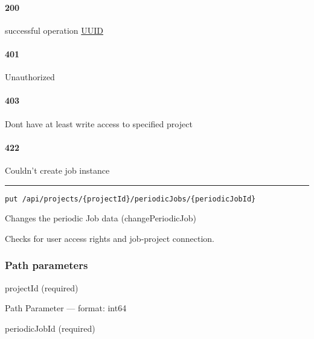 \hypertarget{section-40}{%
\paragraph{200}\label{section-40}}

successful operation \protect\hyperlink{UUID}{UUID}

\hypertarget{section-41}{%
\paragraph{401}\label{section-41}}

Unauthorized \protect\hyperlink{}{}

\hypertarget{section-42}{%
\paragraph{403}\label{section-42}}

Dont have at least write access to specified project
\protect\hyperlink{}{}

\hypertarget{section-43}{%
\paragraph{422}\label{section-43}}

Couldn't create job instance \protect\hyperlink{}{}

\begin{center}\rule{0.5\linewidth}{0.5pt}\end{center}

\protect\hypertarget{changePeriodicJob}{}{}



\begin{verbatim}
put /api/projects/{projectId}/periodicJobs/{periodicJobId}
\end{verbatim}

Changes the periodic Job data ({changePeriodicJob})

Checks for user access rights and job-project connection.

\hypertarget{path-parameters-10}{%
\subsubsection*{Path parameters}\label{path-parameters-10}}

projectId (required)

{Path Parameter} --- format: int64

periodicJobId (required)

